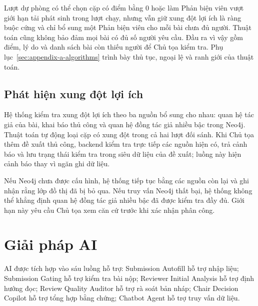 Lượt dự phòng có thể chọn cặp có điểm bằng \(0\) hoặc làm Phản biện viên vượt giới hạn tải phát sinh trong lượt chạy, nhưng vẫn giữ xung đột lợi ích là ràng buộc cứng và chỉ bổ sung một Phản biện viên cho mỗi bài chưa đủ người. Thuật toán cũng không bảo đảm mọi bài có đủ số người yêu cầu. Đầu ra vì vậy gồm điểm, lý do và danh sách bài còn thiếu người để Chủ tọa kiểm tra. Phụ lục~\ref{sec:appendix-a-algorithms} trình bày thủ tục, ngoại lệ và ranh giới của thuật toán.

\subsection{Phát hiện xung đột lợi ích}

Hệ thống kiểm tra xung đột lợi ích theo ba nguồn bổ sung cho nhau: quan hệ tác giả của bài, khai báo thủ công và quan hệ đồng tác giả nhiều bậc trong Neo4j. Thuật toán tự động loại cặp có xung đột trong cả hai lượt đối sánh. Khi Chủ tọa thêm đề xuất thủ công, backend kiểm tra trực tiếp các nguồn hiện có, trả cảnh báo và lưu trạng thái kiểm tra trong siêu dữ liệu của đề xuất; luồng này hiện cảnh báo thay vì ngăn ghi dữ liệu.

Nếu Neo4j chưa được cấu hình, hệ thống tiếp tục bằng các nguồn còn lại và ghi nhận rằng lớp đồ thị đã bị bỏ qua. Nếu truy vấn Neo4j thất bại, hệ thống không thể khẳng định quan hệ đồng tác giả nhiều bậc đã được kiểm tra đầy đủ. Giới hạn này yêu cầu Chủ tọa xem căn cứ trước khi xác nhận phân công.

\section{Giải pháp AI}
\label{sec:ch3-demo-ai}

AI được tích hợp vào sáu luồng hỗ trợ: Submission Autofill hỗ trợ nhập liệu; Submission Gating hỗ trợ kiểm tra bài nộp; Reviewer Initial Analysis hỗ trợ định hướng đọc; Review Quality Auditor hỗ trợ rà soát bản nháp; Chair Decision Copilot hỗ trợ tổng hợp bằng chứng; Chatbot Agent hỗ trợ truy vấn dữ liệu.

